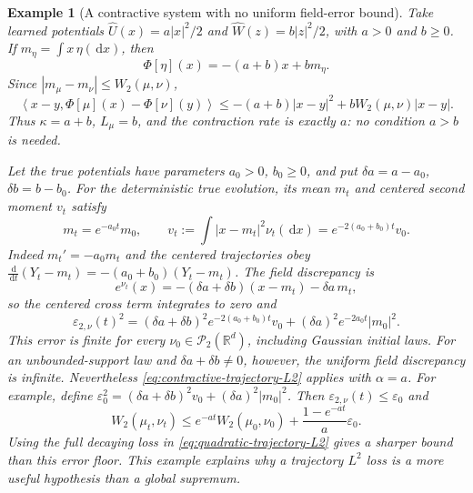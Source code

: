 \documentclass[11pt]{amsart}
\numberwithin{equation}{section}
\theoremstyle{plain}
\newtheorem{example}[theorem]{Example}
\newcommand{\R}{\mathbb{R}}
\newcommand{\cP}{\mathcal{P}}
\newcommand{\dd}{\,\mathrm{d}}
\newcommand{\abs}[1]{\left\lvert#1\right\rvert}
\newcommand{\ip}[2]{\left\langle#1,#2\right\rangle}
\begin{document}
\begin{example}[A contractive system with no uniform field-error bound]
\label{ex:quadratic-contractivity-L2}
Take learned potentials
$\widehat U(x)=a\abs{x}^2/2$ and $\widehat W(z)=b\abs{z}^2/2$, with
$a>0$ and $b\geq0$.  If $m_\eta=\int x\,\eta(\dd x)$, then
\[
 \Phi[\eta](x)=-(a+b)x+b m_\eta.
\]
Since $\abs{m_\mu-m_\nu}\leq W_2(\mu,\nu)$,
\[
 \ip{x-y}{\Phi[\mu](x)-\Phi[\nu](y)}
 \leq-(a+b)\abs{x-y}^2+bW_2(\mu,\nu)\abs{x-y}.
\]
Thus $\kappa=a+b$, $L_\mu=b$, and the contraction rate is exactly $a$:
no condition $a>b$ is needed.

Let the true potentials have parameters $a_0>0$, $b_0\geq0$, and put
$\delta a=a-a_0$, $\delta b=b-b_0$.  For the deterministic true evolution,
its mean $m_t$ and centered second moment $v_t$ satisfy
\[
 m_t=e^{-a_0t}m_0,\qquad
 v_t:=\int\abs{x-m_t}^2\nu_t(\dd x)
     =e^{-2(a_0+b_0)t}v_0.
\]
Indeed $m_t'=-a_0m_t$ and the centered trajectories obey
$\frac{\dd}{\dd t}(Y_t-m_t)=-(a_0+b_0)(Y_t-m_t)$.
The field discrepancy is
\[
 e^{\nu_t}(x)=-(\delta a+\delta b)(x-m_t)-\delta a\,m_t,
\]
so the centered cross term integrates to zero and
\begin{equation}\label{eq:quadratic-trajectory-L2}
 \varepsilon_{2,\nu}(t)^2
 = (\delta a+\delta b)^2 e^{-2(a_0+b_0)t}v_0
   +(\delta a)^2 e^{-2a_0t}\abs{m_0}^2.
\end{equation}
This error is finite for every $\nu_0\in\cP_2(\R^d)$, including Gaussian
initial laws.  For an unbounded-support law and
$\delta a+\delta b\ne0$, however, the uniform field discrepancy is infinite.
Nevertheless \eqref{eq:contractive-trajectory-L2} applies with $\alpha=a$.
For example, define
$\varepsilon_0^2=(\delta a+\delta b)^2v_0+(\delta a)^2\abs{m_0}^2$.
Then $\varepsilon_{2,\nu}(t)\leq\varepsilon_0$ and
\[
 W_2(\mu_t,\nu_t)
 \leq e^{-at}W_2(\mu_0,\nu_0)
       +\frac{1-e^{-at}}{a}\varepsilon_0.
\]
Using the full decaying loss in \eqref{eq:quadratic-trajectory-L2} gives a
sharper bound than this error floor.  This example explains why a
trajectory $L^2$ loss is a more useful hypothesis than a global supremum.
\end{example}
\end{document}
